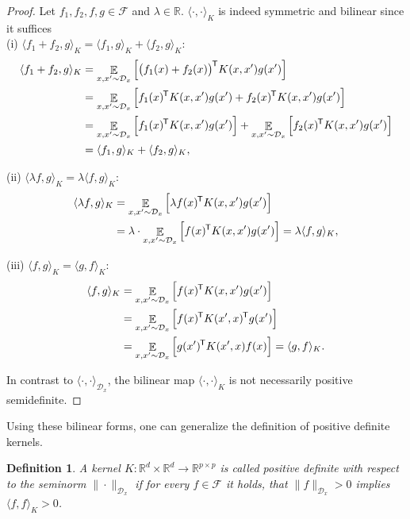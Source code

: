 \documentclass[11pt, a4paper]{article}
\newtheorem{definition}[theorem]{Definition}
\newcommand{\R}{\mathbb{R}}
\newcommand{\D}{\mathcal{D}}
\newcommand{\F}{\mathcal{F}}
\newcommand*{\tr}{^{\mkern-1.5mu\mathsf{T}}}
\DeclareMathOperator*{\E}{\mathbb{E}}
\begin{document}
\begin{proof}
Let $f_1, f_2, f, g \in \F$ and $\lambda \in \R$. $\langle \cdot,\cdot \rangle_{K}$ is indeed symmetric and bilinear since it suffices \\

(i) $\langle f_1 + f_2 , g \rangle_{K} = \langle f_1 , g \rangle_{K} + \langle f_2 , g \rangle_{K}$:
\[ \begin{split}
\langle f_1 + f_2 , g \rangle_{K}
&= \E_{x,x' \sim \D_x} \Big [ \big ( f_1(x) + f_2(x) \big )\tr K(x,x')g(x') \Big ] \\\
&= \E_{x,x' \sim \D_x} \Big [ f_1(x)\tr K(x,x')g(x') + f_2(x)\tr K(x,x')g(x') \Big ] \\\
&= \E_{x,x' \sim \D_x} \Big [ f_1(x)\tr K(x,x')g(x') \Big ] + \E_{x,x' \sim \D_x} \Big [ f_2(x)\tr K(x,x')g(x') \Big ] \\\
&= \langle f_1 , g \rangle_{K} + \langle f_2 , g \rangle_{K},
\end{split} \]

(ii) $\langle \lambda f , g \rangle_{K} = \lambda \langle f, g \rangle_{K}$:
\[ \begin{split} 
\langle \lambda f , g \rangle_{K} 
&= \E_{x,x' \sim \D_x} \Big [ \lambda f(x)\tr K(x,x')g(x') \Big ] \\\
&= \lambda \cdot \E_{x,x' \sim \D_x} \Big [ f(x)\tr K(x,x')g(x') \Big ] = \lambda \langle f, g \rangle_{K}, 
\end{split} \]

(iii) $\langle f , g \rangle_{K} = \langle g , f \rangle_{K}$:
\[ \begin{split} \langle f , g \rangle_{K} 
&= \E_{x,x' \sim \D_x} \Big [ f(x)\tr K(x,x')g(x') \Big ] \\\
&= \E_{x,x' \sim \D_x} \Big [ f(x)\tr K(x',x)\tr g(x') \Big ] \\\
&= \E_{x,x' \sim \D_x} \Big [ g(x')\tr K(x',x)f(x) \Big ] = \langle g , f \rangle_{K}.
\end{split} \]

In contrast to $\langle \cdot , \cdot \rangle_{\D_x}$, the bilinear map $\langle \cdot , \cdot \rangle_{K}$ is not necessarily positive semidefinite.
\end{proof}

Using these bilinear forms, one can generalize the definition of positive definite kernels.

\begin{definition}
A kernel $K: \R^d \times \R^d \to \R^{p \times p}$ is called positive definite with respect to the seminorm $\| \cdot \| _{\D_x}$ if for every $f \in \F$ it holds, that $\| f \|_{\D_x} > 0$ implies $\langle f, f \rangle_K > 0$.
\end{definition}
\end{document}
